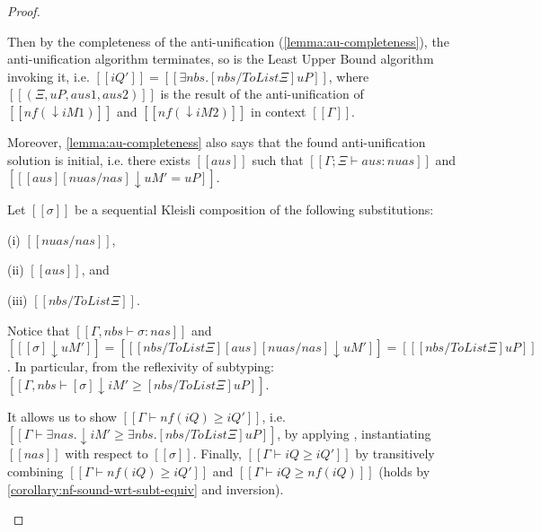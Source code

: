 \begin{proof}
\begin{caseof}
      Then by the completeness of the anti-unification
      (\cref{lemma:au-completeness}), the anti-unification algorithm
      terminates, so is the Least Upper Bound algorithm invoking it, 
      i.e. $[[iQ']] = [[∃nbs.[nbs / ToList Ξ]uP]]$, where
      $[[(Ξ, uP, aus1, aus2)]]$ is the result of the anti-unification
      of $[[nf(↓iM1)]]$ and $[[nf(↓iM2)]]$ in context $[[Γ]]$.

      Moreover, \cref{lemma:au-completeness} also says that the found anti-unification 
      solution is initial, i.e. there exists $[[aus]]$ such that
      $[[Γ;Ξ ⊢ aus :{nuas}]]$ and $[[ [aus][nuas/nas]↓uM' = uP ]]$.

      Let $[[σ]]$ be a sequential Kleisli composition of the following
      substitutions:
      \begin{enumerate*}
      \item[(i)] $[[nuas/nas]]$,
      \item[(ii)] $[[aus]]$, and
      \item[(iii)] $[[nbs / ToList Ξ]]$.
      \end{enumerate*}
      Notice that $[[Γ, nbs ⊢ σ :{nas}]]$
      and $[[ [σ]↓uM' ]] = [[ [nbs / ToList Ξ][aus][nuas/nas]↓uM' ]] = [[ [nbs /
      ToList Ξ]uP ]]$. In particular, from the reflexivity of subtyping:
      $[[Γ, nbs ⊢ [σ]↓iM' ≥ [nbs / ToList Ξ]uP]]$.

      It allows us to show $[[Γ ⊢ nf(iQ) ≥ iQ']]$, i.e. $[[Γ ⊢ ∃nas.↓iM' ≥
      ∃nbs.[nbs / ToList Ξ]uP]]$, by applying ,
      instantiating $[[nas]]$ with respect to $[[σ]]$. Finally, $[[Γ ⊢ iQ ≥ iQ']]$
      by transitively combining $[[Γ ⊢ nf(iQ) ≥ iQ']]$ and $[[Γ ⊢ iQ ≥ nf(iQ)]]$ 
      (holds by \cref{corollary:nf-sound-wrt-subt-equiv} and inversion).
  \end{caseof}
\end{proof}